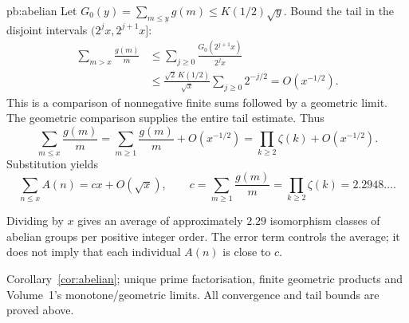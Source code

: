 \begin{solution}{pb:abelian}
Let $G_0(y)=\sum_{m\le y}g(m)\le K(1/2)\sqrt y$.
Bound the tail in the disjoint intervals $(2^jx,2^{j+1}x]$:
\[
\begin{aligned}
\sum_{m>x}\frac{g(m)}m
&\le\sum_{j\ge0}\frac{G_0(2^{j+1}x)}{2^jx}\\
&\le\frac{\sqrt2\,K(1/2)}{\sqrt x}
       \sum_{j\ge0}2^{-j/2}=O(x^{-1/2}).
\end{aligned}
\]
This is a comparison of nonnegative finite sums followed by a geometric
limit. The geometric comparison supplies the entire tail estimate.
Thus
\[
\sum_{m\le x}\frac{g(m)}m
=\sum_{m\ge1}\frac{g(m)}m+O(x^{-1/2})
=\prod_{k\ge2}\zeta(k)+O(x^{-1/2}).
\]
Substitution yields
\[
\boxed{\sum_{n\le x}A(n)=cx+O(\sqrt x)},
\qquad
c=\sum_{m\ge1}\frac{g(m)}m=\boxed{\prod_{k\ge2}\zeta(k)}
=2.2948\ldots.
\]

Dividing by $x$ gives an average of approximately $2.29$ isomorphism classes of abelian groups per positive integer order. The error term controls the average; it does not imply that each individual $A(n)$ is close to $c$.

\tools Corollary~\ref{cor:abelian}; unique prime factorisation, finite geometric products and Volume~1's monotone/geometric limits. All convergence and tail bounds are proved above.
\end{solution}

